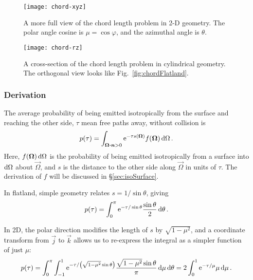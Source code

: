 \begin{figure}[htb]
  \centering
  \texttt{[image: chord-xyz]}
  \caption[A more full view of the chord length problem in 2-D geometry.]%
  {A more full view of the chord length problem in 2-D geometry.
  The polar angle cosine is $\mu= \cos \varphi$, and the azimuthal angle is
  $\theta$.}
  \label{fig:chordXy}
\end{figure}

\begin{figure}[htb]
  \centering
  \texttt{[image: chord-rz]}
  \caption[A cross-section of the chord length problem in cylindrical
  geometry.]%
  {A cross-section of the chord length problem in cylindrical
  geometry. The orthogonal view looks like Fig.~\ref{fig:chordFlatland}.}
  \label{fig:chordRz}
\end{figure}

\subsubsection{Derivation}

The average probability of being emitted isotropically from the surface and
reaching the other side, $\tau$ mean free paths away, without collision is
\begin{align*}
  p(\tau) = \int_{\bm{\Omega}\bm{\cdot}\bm{n}>0} \mathop{}\!\mathrm{e}^{-\tau s(\bm{\Omega}) }
  f(\bm{\Omega}) \mathop{}\!\mathrm{d}\Omega\,.
\end{align*}
Here, $f(\bm{\Omega})\mathop{}\!\mathrm{d}\Omega$ is the probability of being emitted
isotropically from a surface into $\mathop{}\!\mathrm{d}\Omega$ about $\vec{\Omega}$, and $s$ is
the distance to the other side along $\vec{\Omega}$ in units of $\tau$. The
derivation of $f$ will be discussed in \S\ref{sec:isoSurface}.

In flatland, simple geometry relates $s = 1/\sin\theta$, giving
\begin{equation*}
  p(\tau) = \int_{0}^{\pi} \mathop{}\!\mathrm{e}^{-\tau / \sin \theta} \frac{\sin \theta}{2}
  \mathop{}\!\mathrm{d}\theta\,.
\end{equation*}

In 2D, the polar direction modifies the length of $s$ by $\sqrt{1-\mu^2}$, and
a coordinate transform from $\vec{j}$ to $\vec{k}$ allows us to re-express the
integral as a simpler function of just $\mu$:
\begin{equation*}
  p(\tau) = \int_{0}^{\pi} \int_{-1}^{1} \mathop{}\!\mathrm{e}^{-\tau / \left(
  \sqrt{1-\mu^2} \sin\theta \right)}
  \frac{\sqrt{1-\mu^2} \sin\theta}{\pi} \mathop{}\!\mathrm{d}\mu \mathop{}\!\mathrm{d} \theta
  = 2 \int_{0}^{1} \mathop{}\!\mathrm{e}^{-\tau / \mu} \mu \mathop{}\!\mathrm{d}\mu\,.
\end{equation*}

